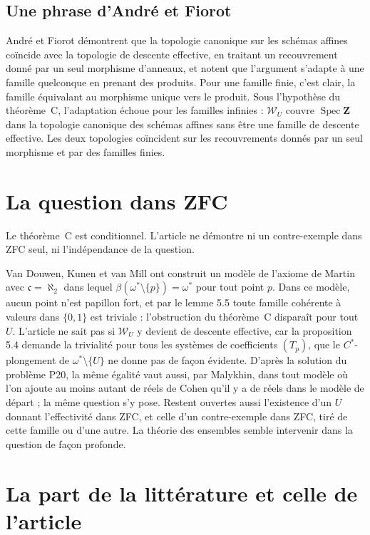 \documentclass[11pt,a4paper]{amsart}
\theoremstyle{definition}
\theoremstyle{plain}
\theoremstyle{remark}
\newcommand{\Z}{\mathbf Z}
\newcommand{\Spec}{\operatorname{Spec}}
\begin{document}
\subsection{Une phrase d'André et Fiorot}

André et Fiorot démontrent que la topologie canonique sur les schémas affines coïncide avec la topologie de descente effective, en traitant un recouvrement donné par un seul morphisme d'anneaux, et notent que l'argument s'adapte à une famille quelconque en prenant des produits. Pour une famille finie, c'est clair, la famille équivalant au morphisme unique vers le produit. Sous l'hypothèse du théorème~C, l'adaptation échoue pour les familles infinies : $\mathcal W_U$ couvre $\Spec\Z$ dans la topologie canonique des schémas affines sans être une famille de descente effective. Les deux topologies coïncident sur les recouvrements donnés par un seul morphisme et par des familles finies.

\section{La question dans ZFC}

Le théorème~C est conditionnel. L'article ne démontre ni un contre-exemple dans ZFC seul, ni l'indépendance de la question.

Van Douwen, Kunen et van Mill ont construit un modèle de l'axiome de Martin avec $\mathfrak c=\aleph_2$ dans lequel $\beta(\omega^*\setminus\{p\})=\omega^*$ pour tout point $p$. Dans ce modèle, aucun point n'est papillon fort, et par le lemme 5.5 toute famille cohérente à valeurs dans $\{0,1\}$ est triviale : l'obstruction du théorème~C disparaît pour tout $U$. L'article ne sait pas si $\mathcal W_U$ y devient de descente effective, car la proposition 5.4 demande la trivialité pour tous les systèmes de coefficients $(T_p)$, que le $C^*$-plongement de $\omega^*\setminus\{U\}$ ne donne pas de façon évidente. D'après la solution du problème P20, la même égalité vaut aussi, par Malykhin, dans tout modèle où l'on ajoute au moins autant de réels de Cohen qu'il y a de réels dans le modèle de départ ; la même question s'y pose. Restent ouvertes aussi l'existence d'un $U$ donnant l'effectivité dans ZFC, et celle d'un contre-exemple dans ZFC, tiré de cette famille ou d'une autre. La théorie des ensembles semble intervenir dans la question de façon profonde.

\section{La part de la littérature et celle de l'article}
\end{document}

